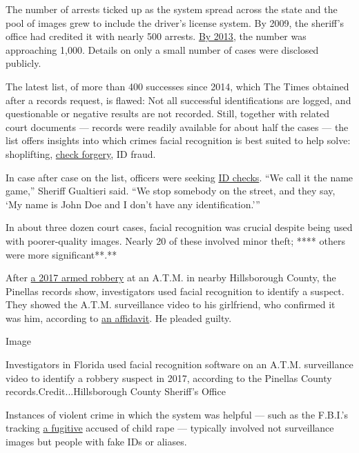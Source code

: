 The number of arrests ticked up as the system spread across the state
and the pool of images grew to include the driver's license system. By
2009, the sheriff's office had credited it with nearly 500 arrests.
\href{https://www.washingtonpost.com/business/technology/state-photo-id-databases-become-troves-for-police/2013/06/16/6f014bd4-ced5-11e2-8845-d970ccb04497_story.html}{By
2013}, the number was approaching 1,000. Details on only a small number
of cases were disclosed publicly.

The latest list, of more than 400 successes since 2014, which The Times
obtained after a records request, is flawed: Not all successful
identifications are logged, and questionable or negative results are not
recorded. Still, together with related court documents --- records were
readily available for about half the cases --- the list offers insights
into which crimes facial recognition is best suited to help solve:
shoplifting,
\href{https://www.documentcloud.org/documents/6591405-Forgery-Redacted.html}{check
forgery}, ID fraud.

In case after case on the list, officers were seeking
\href{https://www.documentcloud.org/documents/6591397-Falsename-Redacted.html}{ID
checks}. ``We call it the name game,'' Sheriff Gualtieri said. ``We stop
somebody on the street, and they say, `My name is John Doe and I don't
have any identification.'''

In about three dozen court cases, facial recognition was crucial despite
being used with poorer-quality images. Nearly 20 of these involved minor
theft; **** others were more significant**.**

After
\href{https://www.tampabay.com/news/publicsafety/crime/deputies-brandon-man-faces-charges-after-robbing-victim-at-an-atm-at/2314761/}{a
2017 armed robbery} at an A.T.M. in nearby Hillsborough County, the
Pinellas records show, investigators used facial recognition to identify
a suspect. They showed the A.T.M. surveillance video to his girlfriend,
who confirmed it was him, according to
\href{https://www.documentcloud.org/documents/6587337-ATMcase-Redacted.html}{an
affidavit}. He pleaded guilty.

Image

Investigators in Florida used facial recognition software on an A.T.M.
surveillance video to identify a robbery suspect in 2017, according to
the Pinellas County records.Credit...Hillsborough County Sheriff's
Office

Instances of violent crime in which the system was helpful --- such as
the F.B.I.'s tracking
\href{https://www.bostonglobe.com/metro/2016/06/16/after-years-run-dorchester-man-arrested/Gpv7i9fJEP9pMNn00sQn4I/story.html}{a
fugitive} accused of child rape --- typically involved not surveillance
images but people with fake IDs or aliases.

